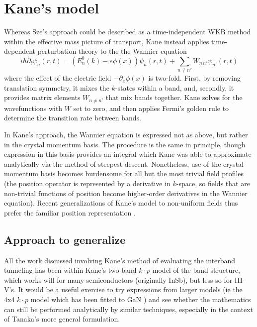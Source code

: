 \section{Kane's model}
Whereas Sze's approach could be described as a time-independent WKB method within the effective mass picture of transport, Kane instead applies time-dependent perturbation theory to the the Wannier equation
$$i\hbar\partial_t\psi_n(r,t)=(E_n^0(k)-e\phi(x))\psi_n(r,t)+\sum_{n\neq n'} W_{n\,n'}\psi_{n'}(r,t)$$
where the effect of the electric field $-\partial_x\phi(x)$ is two-fold.  First, by removing translation symmetry, it mixes the $k$-states within a band, and, secondly, it provides matrix elements $W_{n\neq n'}$ that mix bands together.  Kane solves for the wavefunctions with $W$ set to zero, and then applies Fermi's golden rule to determine the transition rate between bands.

In Kane's approach, the Wannier equation is expressed not as above, but rather in the crystal momentum basis.  The procedure is the same in principle, though expression in this basis provides an integral which Kane was able to approximate analytically via the method of steepest descent.  Nonetheless, use of the crystal momentum basis becomes burdensome for all but the most trivial field profiles (the position operator is represented by a derivative in $k$-space, so fields that are non-trivial functions of position become higher-order derivatives in the Wannier equation).  Recent generalizations of Kane's model to non-uniform fields thus prefer the familiar position representation \cite{Tanaka_1994}.

\subsection{Approach to generalize}
All the work discussed involving Kane's method of evaluating the interband tunneling has been within Kane's two-band $k\cdot p$ model of the band structure, which works will for many semiconductors (originally InSb), but less so for III-V's.  It would be a useful exercise to try expressions from larger models (ie the 4x4 $k\cdot p$ model which has been fitted to GaN \cite{Rinke_2008}) and see whether the mathematics can still be performed analytically by similar techniques, especially  in the context of Tanaka's more general formulation.